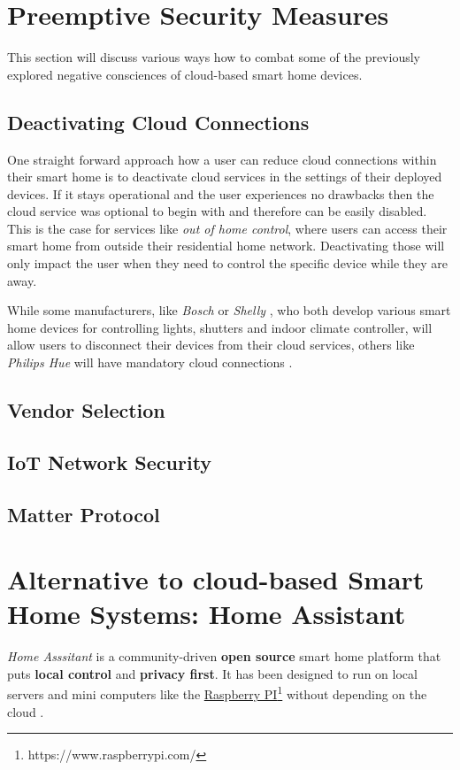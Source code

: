 

\section{Preemptive Security Measures}
This section will discuss various ways how to combat some of the previously explored negative consciences of cloud-based smart home devices.

\subsection{Deactivating Cloud Connections}
One straight forward approach how a user can reduce cloud connections within their smart home is to deactivate cloud services in the settings of their deployed devices. If it stays operational and the user experiences no drawbacks then the cloud service was optional to begin with and therefore can be easily disabled. This is the case for services like \textit{out of home control}, where users can access their smart home from outside their residential home network. Deactivating those will only impact the user when they need to control the specific device while they are away. 

While some manufacturers, like \textit{Bosch} \cite{BoschHelpSmartController} or \textit{Shelly} \cite{ShellySmartControlApp}, who both develop various smart home devices for controlling lights, shutters and indoor climate controller, will allow users to disconnect their devices from their cloud services, others like \textit{Philips Hue} will have mandatory cloud connections \cite{Tuohy2023PhiliphHue}.

\subsection{Vendor Selection}

\subsection{IoT Network Security}

\subsection{Matter Protocol}
\newpage


\section{Alternative to cloud-based Smart Home Systems: Home Assistant} \label{sec:Home Assistant}
\textit{Home Asssitant} is a community-driven \textbf{open source} smart home platform that puts \textbf{local control} and \textbf{privacy first}. It has been designed to run on local servers and mini computers like the \href{https://www.raspberrypi.com/}{Raspberry PI}\footnote{https://www.raspberrypi.com/} without depending on the cloud \cite{HomeAssistant_Startpage}.

